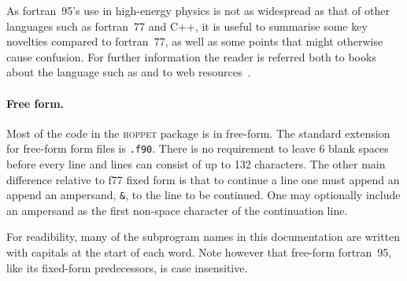 \documentclass[12pt]{article}
\newcommand{\hoppet}{\textsc{hoppet}\xspace}
\newcommand{\ttt}[1]{\texttt{#1}}
\begin{document}
As fortran~95's use in high-energy physics is not as widespread as
that of other languages such as fortran~77 and C++, it is useful to
summarise some key novelties compared to fortran~77, as well as some
points that might otherwise cause confusion. For further information
the reader is referred both to books about the language such as
\cite{F95Explained} and to web resources~\cite{F95WebResources}.

\paragraph{Free form.}  Most of the code in the \hoppet package is in
free-form. The standard extension for free-form form files is
\ttt{.f90}. There is no requirement to leave 6 blank spaces before
every line and lines can consist of up to 132 characters. The other
main difference relative to f77 fixed form is that to continue a line
one must append an append an ampersand, \ttt{\&}, to the line to be
continued. One may optionally include an ampersand as the first
non-space character of the continuation line.

For readibility, many of the subprogram names in this documentation
are written with capitals at the start of each word. Note however that
free-form fortran~95, like its fixed-form predecessors, is case
insensitive.
\end{document}
